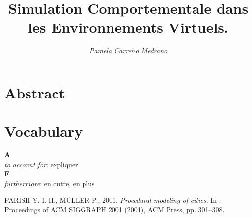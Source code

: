 \documentclass[11pt]{article}
\title{Simulation Comportementale dans les Environnements Virtuels.}
\author{\textit{Pamela Carre$\tilde{n}$o Medrano}}
\date{
	\begin{center}
		Master Thesis \\
		Equipe Vortex - ENI Brest IRIT - Université de Toulouse \\
		Année 2012
	\end{center}
}
\begin{document}
\maketitle
\section*{Abstract}

\section{Vocabulary}

\noindent \textbf{A}\\
\textit{to account for}: expliquer \\
\textbf{F}\\
\textit{furthermore}: en outre, en plus \\

\begin{thebibliography}{2} 

\label{Parish and Muller (2001)}
PARISH Y. I. H., MÜLLER P.. 2001.
\textit{Procedural modeling of cities}.
In : Proceedings of ACM SIGGRAPH 2001 (2001), ACM Press, pp. 301–308.

\end{thebibliography}
\end{document}
